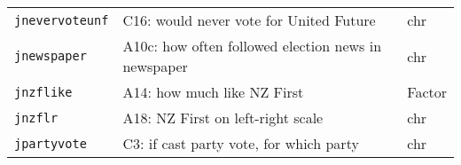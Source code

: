\documentclass[]{article}
\begin{document}
\begin{longtable}[]{@{}lll@{}}
\begin{minipage}[t]{0.14\columnwidth}
\texttt{jnevervoteunf}\strut
\end{minipage} & \begin{minipage}[t]{0.70\columnwidth}\raggedright\strut
C16: would never vote for United Future\strut
\end{minipage} & \begin{minipage}[t]{0.08\columnwidth}\raggedright\strut
chr\strut
\end{minipage}\tabularnewline
\begin{minipage}[t]{0.14\columnwidth}\raggedright\strut
\texttt{jnewspaper}\strut
\end{minipage} & \begin{minipage}[t]{0.70\columnwidth}\raggedright\strut
A10c: how often followed election news in newspaper\strut
\end{minipage} & \begin{minipage}[t]{0.08\columnwidth}\raggedright\strut
chr\strut
\end{minipage}\tabularnewline
\begin{minipage}[t]{0.14\columnwidth}\raggedright\strut
\texttt{jnzflike}\strut
\end{minipage} & \begin{minipage}[t]{0.70\columnwidth}\raggedright\strut
A14: how much like NZ First\strut
\end{minipage} & \begin{minipage}[t]{0.08\columnwidth}\raggedright\strut
Factor\strut
\end{minipage}\tabularnewline
\begin{minipage}[t]{0.14\columnwidth}\raggedright\strut
\texttt{jnzflr}\strut
\end{minipage} & \begin{minipage}[t]{0.70\columnwidth}\raggedright\strut
A18: NZ First on left-right scale\strut
\end{minipage} & \begin{minipage}[t]{0.08\columnwidth}\raggedright\strut
chr\strut
\end{minipage}\tabularnewline
\begin{minipage}[t]{0.14\columnwidth}\raggedright\strut
\texttt{jpartyvote}\strut
\end{minipage} & \begin{minipage}[t]{0.70\columnwidth}\raggedright\strut
C3: if cast party vote, for which party\strut
\end{minipage} & \begin{minipage}[t]{0.08\columnwidth}\raggedright\strut
chr\strut
\end{minipage}\tabularnewline

\end{longtable}
\end{document}
